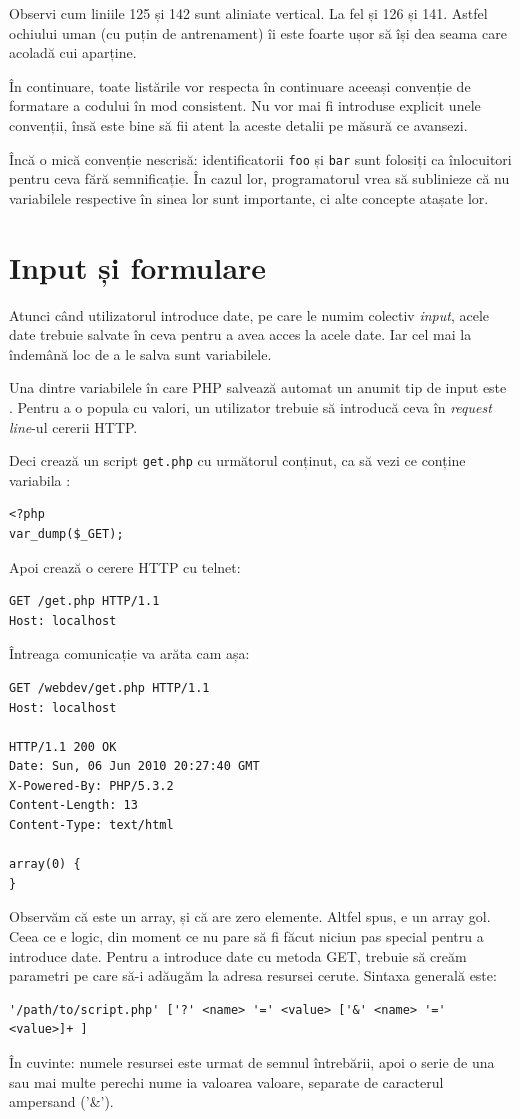 Observi cum liniile 125 și 142 sunt aliniate vertical. La fel și 126 și 141. Astfel ochiului uman (cu puțin de antrenament)
îi este foarte ușor să își dea seama care acoladă cui aparține.

În continuare, toate listările vor respecta în continuare aceeași convenție de formatare a codului
în mod consistent. Nu vor mai fi introduse explicit unele convenții, însă este bine să fii atent
la aceste detalii pe măsură ce avansezi.

Încă o mică convenție nescrisă: identificatorii \texttt{foo} și \texttt{bar} sunt folosiți ca înlocuitori
pentru ceva fără semnificație. În cazul lor, programatorul vrea să sublinieze că nu variabilele respective
în sinea lor sunt importante, ci alte concepte atașate lor.

\section{Input și formulare}
Atunci când utilizatorul introduce date, pe care le numim colectiv \textsl{input},
acele date trebuie salvate în ceva pentru a avea acces la acele date. Iar cel
mai la îndemână loc de a le salva sunt variabilele.

Una dintre variabilele în care PHP salvează automat un anumit tip de input este \get.
Pentru a o popula cu valori, un utilizator trebuie să introducă ceva în \textsl{request line}-ul
cererii HTTP.

Deci crează un script \texttt{get.php} cu următorul conținut, ca să vezi ce conține variabila \get:
\begin{lstlisting}
<?php
var_dump($_GET);
\end{lstlisting}
Apoi crează o cerere HTTP cu telnet:
\begin{verbatim}
GET /get.php HTTP/1.1
Host: localhost

\end{verbatim}
Întreaga comunicație va arăta cam așa:
\begin{verbatim}
GET /webdev/get.php HTTP/1.1
Host: localhost

HTTP/1.1 200 OK
Date: Sun, 06 Jun 2010 20:27:40 GMT
X-Powered-By: PHP/5.3.2
Content-Length: 13
Content-Type: text/html

array(0) {
}
\end{verbatim}
Observăm că {\get} este un array, și că are zero elemente. Altfel spus,
e un array gol. Ceea ce e logic, din moment ce nu pare să fi făcut niciun
pas special pentru a introduce date. Pentru a introduce date cu metoda GET,
trebuie să creăm parametri pe care să-i adăugăm la adresa resursei cerute.
Sintaxa generală este:
\begin{verbatim}
'/path/to/script.php' ['?' <name> '=' <value> ['&' <name> '=' <value>]+ ]
\end{verbatim}
În cuvinte: numele resursei este urmat de semnul întrebării, apoi o serie de
una sau mai multe perechi nume {\glqq}ia valoarea{\grqq} valoare, separate de caracterul
ampersand ('\&').


